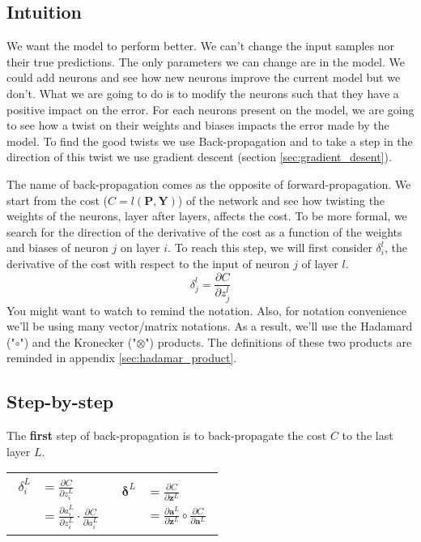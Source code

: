 		\subsection{Intuition}
			We want the model to perform better. We can't change the input samples nor their true predictions. The only parameters we can change are in the model. We could add neurons and see how new neurons improve the current model but we don't. What we are going to do is to modify the neurons such that they have a positive impact on the error. For each neurons present on the model, we are going to see how a twist on their weights and biases impacts the error made by the model. To find the good twists we use Back-propagation and to take a step in the direction of this twist we use gradient descent (section \ref{sec:gradient_desent}).

			The name of back-propagation comes as the opposite of forward-propagation. We start from the cost ($C=l(\boldsymbol{P},\boldsymbol{Y})$) of the network and see how twisting the weights of the neurons, layer after layers, affects the cost. To be more formal, we search for the direction of the derivative of the cost as a function of the weights and biases of neuron $j$ on layer $i$. To reach this step, we will first consider $\delta^l_i$, the derivative of the cost with respect to the input of neuron $j$ of layer $l$.
			$$ \delta^l_j = \frac{\partial C}{\partial z^l_j } $$
			You might want to watch  to remind the notation. Also, for notation convenience we'll be using many vector/matrix notations. As a result, we'll use the Hadamard ("$\circ$") and the Kronecker ("$\otimes$") products. The definitions of these two products are reminded in appendix \ref{sec:hadamar_product}.

		\subsection{Step-by-step}
			The \textbf{first} step of back-propagation is to back-propagate the cost $C$ to the last layer $L$.

			\begin{tabular}{c|c}
				\parbox{14em}{
					\begin{equation}
						\begin{split}
							\delta^L_i
							&= \frac{\partial C}{\partial z^L_i } \\
							&= \frac{\partial a^L_i }{\partial z^L_i } \cdot \frac{\partial C}{\partial a^L_i }
						\end{split}
					\end{equation}
				}
				& \parbox{14em}{
					\begin{equation}
						\begin{split}
							\boldsymbol{\delta}^L
							&= \frac{\partial C}{\partial \boldsymbol{z}^L } \\
							&= \frac{\partial \boldsymbol{a}^L }{\partial \boldsymbol{z}^L } \circ \frac{\partial C}{\partial \boldsymbol{a}^L }
						\end{split}
					\end{equation}
				}
			\end{tabular}

